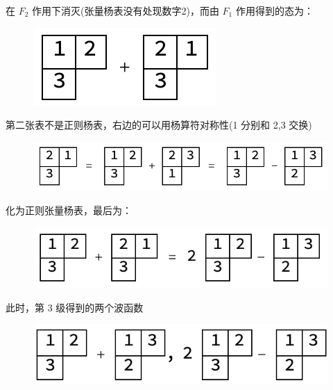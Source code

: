 \documentclass[UTF8]{ctexart}
\begin{document}
\noindent 在 $F_2$ 作用下消灭(张量杨表没有处现数字2)，而由 $F_1$ 作用得到的态为：

\begin{figure}[H]
\begin{centering}
\includegraphics[width=0.25\linewidth]{include/Y7}
\par\end{centering}
\end{figure}

\noindent 第二张表不是正则杨表，右边的可以用杨算符对称性(1 分别和 2,3 交换)

\begin{figure}[H]
\begin{centering}
\includegraphics[width=0.6\linewidth]{include/Y8}
\par\end{centering}
\end{figure}

\noindent 化为正则张量杨表，最后为：

\begin{figure}[H]
\begin{centering}
\includegraphics[width=0.5\linewidth]{include/Y9}
\par\end{centering}
\end{figure}

\noindent 此时，第 3 级得到的两个波函数

\begin{figure}[H]
\begin{centering}
\includegraphics[width=0.5\linewidth]{include/Y10}
\par\end{centering}
\end{figure}
\end{document}
